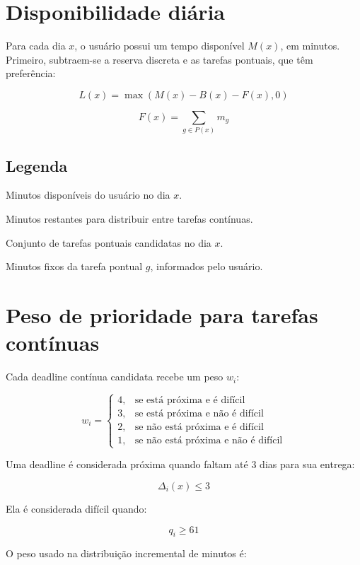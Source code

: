 \documentclass[12pt,a4paper]{article}
\begin{document}
\section{Disponibilidade diária}

Para cada dia $x$, o usuário possui um tempo disponível $M(x)$, em minutos. Primeiro, subtraem-se a reserva discreta e as tarefas pontuais, que têm preferência:

\[
L(x) =
\max
\left(
M(x) - B(x) - F(x),
0
\right)
\]

\[
F(x) =
\sum_{g \in P(x)} m_g
\]

\subsection*{Legenda}

\begin{description}[leftmargin=2.2cm]
    \item[$M(x)$] Minutos disponíveis do usuário no dia $x$.
    \item[$L(x)$] Minutos restantes para distribuir entre tarefas contínuas.
    \item[$P(x)$] Conjunto de tarefas pontuais candidatas no dia $x$.
    \item[$m_g$] Minutos fixos da tarefa pontual $g$, informados pelo usuário.
\end{description}

\section{Peso de prioridade para tarefas contínuas}

Cada deadline contínua candidata recebe um peso $w_i$:

\[
w_i =
\begin{cases}
4, & \text{se está próxima e é difícil} \\
3, & \text{se está próxima e não é difícil} \\
2, & \text{se não está próxima e é difícil} \\
1, & \text{se não está próxima e não é difícil}
\end{cases}
\]

Uma deadline é considerada próxima quando faltam até $3$ dias para sua entrega:

\[
\Delta_i(x) \leq 3
\]

Ela é considerada difícil quando:

\[
q_i \geq 61
\]

O peso usado na distribuição incremental de minutos é:
\end{document}
